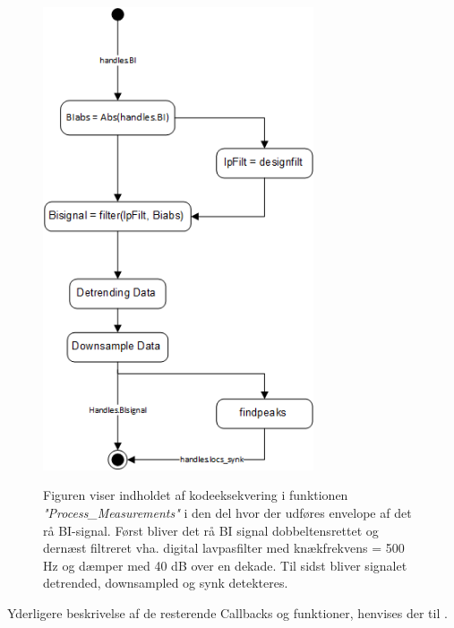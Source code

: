 \begin{figure}[H]
\centering
{\includegraphics[width=8cm]
{Figure/designUML}}
\caption{Figuren viser indholdet af kodeeksekvering i funktionen \textit{"Process\_Measurements"} i den del hvor der udføres envelope af det rå BI-signal. Først bliver det rå BI signal dobbeltensrettet og dernæst filtreret vha. digital lavpasfilter med knækfrekvens = 500 Hz og dæmper med 40 dB over en dekade. Til sidst bliver signalet detrended, downsampled og synk detekteres.}
\label{Fig:designUML}
\end{figure} 

Yderligere beskrivelse af de resterende Callbacks og funktioner, henvises der til . 
